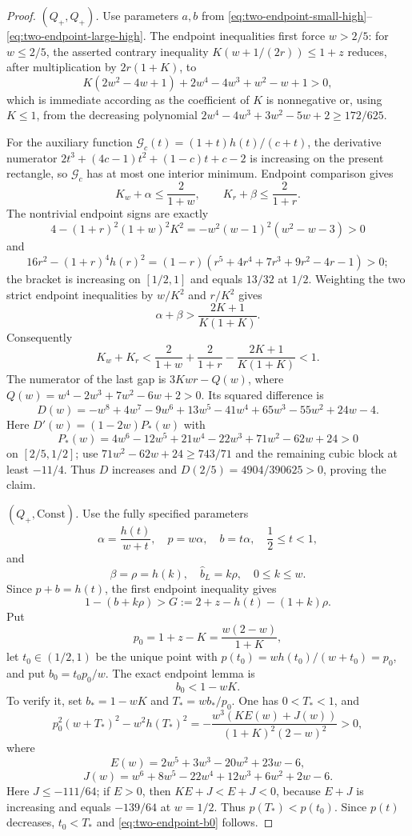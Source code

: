 \begin{proof}
\smallskip\noindent
\emph{$(Q_+,Q_+)$.}
Use parameters $a,b$ from \eqref{eq:two-endpoint-small-high}--
\eqref{eq:two-endpoint-large-high}.  The endpoint inequalities first force
$w>2/5$: for $w\le2/5$, the asserted contrary inequality
$K(w+1/(2r))\le1+z$ reduces, after multiplication by $2r(1+K)$, to
\[
 K(2w^2-4w+1)+2w^4-4w^3+w^2-w+1>0,
\]
which is immediate according as the coefficient of $K$ is nonnegative or,
using $K\le1$, from the decreasing polynomial
$2w^4-4w^3+3w^2-5w+2\ge172/625$.

For the auxiliary function $\mathcal G_c(t)=(1+t)h(t)/(c+t)$, the derivative numerator
$2t^3+(4c-1)t^2+(1-c)t+c-2$ is increasing on the present rectangle, so
$\mathcal G_c$ has at most one interior minimum. Endpoint comparison gives
\[
 K_w+\alpha\le\frac2{1+w},\qquad
 K_r+\beta\le\frac2{1+r}.
\]
The nontrivial endpoint signs are exactly
\[
 4-(1+r)^2(1+w)^2K^2
 =-w^2(w-1)^2(w^2-w-3)>0
\]
and
\[
 16r^2-(1+r)^4h(r)^2
 =(1-r)(r^5+4r^4+7r^3+9r^2-4r-1)>0;
\]
the bracket is increasing on $[1/2,1]$ and equals $13/32$ at $1/2$.
Weighting the two strict endpoint inequalities by $w/K^2$ and $r/K^2$
gives
\[
 \alpha+\beta>\frac{2K+1}{K(1+K)}.
\]
Consequently
\[
 K_w+K_r<\frac2{1+w}+\frac2{1+r}
 -\frac{2K+1}{K(1+K)}<1.
\]
The numerator of the last gap is $3Kwr-Q(w)$, where
$Q(w)=w^4-2w^3+7w^2-6w+2>0$.  Its squared difference is
\[
 D(w)=-w^8+4w^7-9w^6+13w^5-41w^4+65w^3-55w^2+24w-4.
\]
Here $D'(w)=(1-2w)P_*(w)$ with
\[
 P_*(w)=4w^6-12w^5+21w^4-22w^3+71w^2-62w+24>0
\]
on $[2/5,1/2]$; use
$71w^2-62w+24\ge743/71$ and the remaining cubic block at least $-11/4$.
Thus $D$ increases and $D(2/5)=4904/390625>0$, proving the claim.

\smallskip\noindent
\emph{$(Q_+,\mathrm{Const})$.}
Use the fully specified parameters
\[
 \alpha=\frac{h(t)}{w+t},\quad p=w\alpha,\quad b=t\alpha,
 \quad\frac12\le t<1,
\]
and
\[
 \beta=\rho=h(k),\quad \widehat b_L=k\rho,\quad 0\le k\le w.
\]
Since $p+b=h(t)$, the first endpoint inequality gives
\begin{equation}
 1-(b+k\rho)>G:=2+z-h(t)-(1+k)\rho.
 \label{eq:two-endpoint-high-L-G}
\end{equation}
Put
\[
 p_0=1+z-K=\frac{w(2-w)}{1+K},
\]
let $t_0\in(1/2,1)$ be the unique point with
$p(t_0)=wh(t_0)/(w+t_0)=p_0$, and put $b_0=t_0p_0/w$.
The exact endpoint lemma is
\begin{equation}
 b_0<1-wK.
 \label{eq:two-endpoint-b0}
\end{equation}
To verify it, set $b_*=1-wK$ and $T_*=wb_*/p_0$.  One has $0<T_*<1$, and
\[
 p_0^2(w+T_*)^2-w^2h(T_*)^2
 =-\frac{w^3(KE(w)+J(w))}{(1+K)^2(2-w)^2}>0,
\]
where
\[
 E(w)=2w^5+3w^3-20w^2+23w-6,
\]
\[
 J(w)=w^6+8w^5-22w^4+12w^3+6w^2+2w-6.
\]
Here $J\le-111/64$; if $E>0$, then
$KE+J<E+J<0$, because $E+J$ is increasing and equals $-139/64$ at
$w=1/2$.  Thus $p(T_*)<p(t_0)$.  Since $p(t)$ decreases,
$t_0<T_*$ and \eqref{eq:two-endpoint-b0} follows.


\end{proof}
